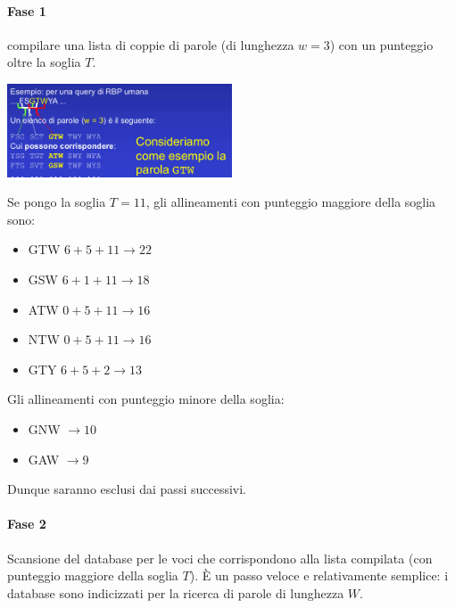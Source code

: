\documentclass{article}
\begin{document}
\paragraph{Fase 1}compilare una lista di coppie di parole (di
lunghezza $w = 3$) con un punteggio oltre la soglia $T$.
\begin{center}
    \includegraphics[width=0.5\textwidth]{figures/fas1.png}
\end{center}
Se pongo la soglia $T = 11$, gli allineamenti con punteggio maggiore della soglia sono:
\begin{itemize}
    \item GTW $6+5+11 \rightarrow 22$
    \item GSW $6+1+11 \rightarrow 18$
    \item ATW $0+5+11 \rightarrow 16$
    \item NTW $0+5+11 \rightarrow 16$
    \item GTY $6+5+2 \rightarrow 13$
\end{itemize}
Gli allineamenti con punteggio minore della soglia:
\begin{itemize}
    \item GNW $\rightarrow 10$
    \item GAW $\rightarrow 9$
\end{itemize}
Dunque saranno esclusi dai passi successivi.
\paragraph{Fase 2}Scansione del database per le voci che
corrispondono alla lista compilata (con punteggio
maggiore della soglia $T$). È un passo veloce e relativamente semplice: i
database sono indicizzati per la ricerca di parole di
lunghezza $W$.
\end{document}
